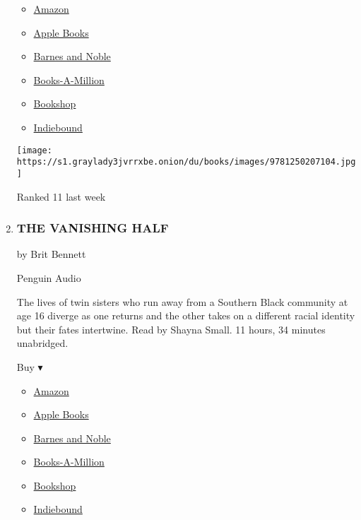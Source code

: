 \begin{enumerate}
  \begin{itemize}
  \tightlist
  \item
    \href{https://www.amazon.com/dp/125020710X?tag=NYTBSREV-20\&tag=NYTBS-20}{Amazon}
  \item
    \href{https://du-gae-books-dot-nyt-du-prd.appspot.com/buy?title=HIDEAWAY\&author=Nora+Roberts}{Apple
    Books}
  \item
    \href{https://www.anrdoezrs.net/click-7990613-11819508?url=https\%3A\%2F\%2Fwww.barnesandnoble.com\%2Fw\%2F\%3Fean\%3D9781250752390}{Barnes
    and Noble}
  \item
    \href{https://www.anrdoezrs.net/click-7990613-35140?url=https\%3A\%2F\%2Fwww.booksamillion.com\%2Fp\%2FHIDEAWAY\%2FNora\%2BRoberts\%2F9781250752390}{Books-A-Million}
  \item
    \href{https://bookshop.org/a/3546/9781250752390}{Bookshop}
  \item
    \href{https://www.indiebound.org/book/9781250752390?aff=NYT}{Indiebound}
  \end{itemize}

  \texttt{[image: https://s1.graylady3jvrrxbe.onion/du/books/images/9781250207104.jpg]}

  Ranked 11 last week
\item
  \hypertarget{the-vanishing-half}{%
  \subsubsection{THE VANISHING HALF}\label{the-vanishing-half}}

  by Brit Bennett

  Penguin Audio

  The lives of twin sisters who run away from a Southern Black community
  at age 16 diverge as one returns and the other takes on a different
  racial identity but their fates intertwine. Read by Shayna Small. 11
  hours, 34 minutes unabridged.

  Buy ▾

  \begin{itemize}
  \tightlist
  \item
    \href{https://www.amazon.com/dp/0525536299?tag=NYTBSREV-20\&tag=NYTBS-20}{Amazon}
  \item
    \href{https://du-gae-books-dot-nyt-du-prd.appspot.com/buy?title=THE+VANISHING+HALF\&author=Brit+Bennett}{Apple
    Books}
  \item
    \href{https://www.anrdoezrs.net/click-7990613-11819508?url=https\%3A\%2F\%2Fwww.barnesandnoble.com\%2Fw\%2F\%3Fean\%3D9780525637141}{Barnes
    and Noble}
  \item
    \href{https://www.anrdoezrs.net/click-7990613-35140?url=https\%3A\%2F\%2Fwww.booksamillion.com\%2Fp\%2FTHE\%2BVANISHING\%2BHALF\%2FBrit\%2BBennett\%2F9780525637141}{Books-A-Million}
  \item
    \href{https://bookshop.org/a/3546/9780525637141}{Bookshop}
  \item
    \href{https://www.indiebound.org/book/9780525637141?aff=NYT}{Indiebound}
  \end{itemize}


\end{enumerate}

